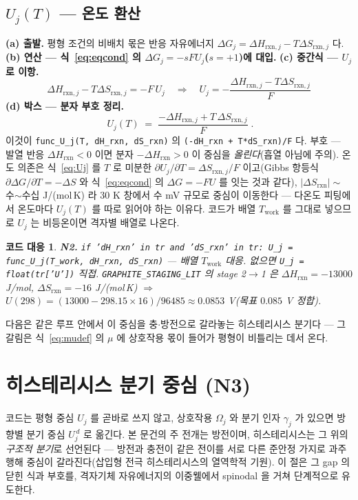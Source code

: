 \documentclass[11pt,a4paper]{article}
\newtheorem*{codebox}{코드 대응}
\newcommand{\rxn}{\mathrm{rxn}}
\newcommand{\work}{\mathrm{work}}
\newcommand{\code}[1]{\texttt{#1}}
\begin{document}
\subsection{$U_j(T)$ — 온도 환산}
\textbf{(a) 출발.} 평형 조건의 비배치 몫은 반응 자유에너지 $\Delta G_j=\Delta H_{\rxn,j}-T\Delta S_{\rxn,j}$ 다.
\textbf{(b) 연산 — 식~\eqref{eq:eqcond} 의 $\Delta G_j=-sFU_j$($s=+1$)에 대입.} \textbf{(c) 중간식 — $U_j$ 로 이항.}
\begin{equation}
\Delta H_{\rxn,j}-T\Delta S_{\rxn,j}=-F\,U_j
\quad\Longrightarrow\quad
U_j=-\frac{\Delta H_{\rxn,j}-T\Delta S_{\rxn,j}}{F}
\label{eq:Ujmid}
\end{equation}
\textbf{(d) 박스 — 분자 부호 정리.}
\begin{equation}
\boxed{\;U_j(T)\;=\;\frac{-\Delta H_{\rxn,j}+T\,\Delta S_{\rxn,j}}{F}\;.}
\label{eq:Uj}
\end{equation}
이것이 \code{func\_U\_j(T, dH\_rxn, dS\_rxn)} 의 \code{(-dH\_rxn + T*dS\_rxn)/F} 다. 부호 — 발열 반응
$\Delta H_\rxn<0$ 이면 분자 $-\Delta H_\rxn>0$ 이 중심을 \emph{올린다}(흡열 아님에 주의). 온도 의존은 식~\eqref{eq:Uj} 를
$T$ 로 미분한 $\partial U_j/\partial T=\Delta S_{\rxn,j}/F$ 이고(Gibbs 항등식 $\partial\Delta G/\partial T=-\Delta S$ 와
식~\eqref{eq:eqcond} 의 $\Delta G=-FU$ 를 잇는 것과 같다), $|\Delta S_\rxn|\sim$ 수$\sim$수십 J/(mol\,K) 라 $30$ K
창에서 수 mV 규모로 중심이 이동한다 — 다온도 피팅에서 온도마다 $U_j(T)$ 를 따로 읽어야 하는 이유다. 코드가 배열
$T_\work$ 를 그대로 넣으므로 $U_j$ 는 비등온이면 격자별 배열로 나온다.

\begin{codebox}
\textbf{N2.} \code{if 'dH\_rxn' in tr and 'dS\_rxn' in tr: U\_j = func\_U\_j(T\_work, dH\_rxn, dS\_rxn)}
— 배열 $T_\work$ 대응. 없으면 \code{U\_j = float(tr['U'])} 직접. \code{GRAPHITE\_STAGING\_LIT} 의 stage 2$\to$1 은
$\Delta H_\rxn=-13000$ J/mol, $\Delta S_\rxn=-16$ J/(mol\,K) $\Rightarrow$ $U(298)=(13000-298.15\times16)/96485
\approx0.0853$ V(목표 $0.085$ V 정합).
\end{codebox}

다음은 같은 루프 안에서 이 중심을 충$\cdot$방전으로 갈라놓는 히스테리시스 분기다 — 그 갈림은 식~\eqref{eq:mudef} 의
$\mu$ 에 상호작용 몫이 들어가 평형이 비틀리는 데서 온다.

\section{히스테리시스 분기 중심 (N3)}\label{sec:hys}
코드는 평형 중심 $U_j$ 를 곧바로 쓰지 않고, 상호작용 $\Omega_j$ 와 분기 인자 $\gamma_j$ 가 있으면 방향별 분기 중심
$U_j^{\,d}$ 로 옮긴다. 본 문건의 주 전개는 방전이며, 히스테리시스는 그 위의 \emph{구조적 분기}로 선언된다 — 방전과 충전이
같은 전이를 서로 다른 준안정 가지로 과주행해 중심이 갈라진다(삽입형 전극 히스테리시스의 열역학적 기원\cite{dreyer2010}).
이 절은 그 gap 의 닫힌 식과 부호를, 격자기체 자유에너지의
이중웰에서 spinodal 을 거쳐 단계적으로 유도한다.
\end{document}
